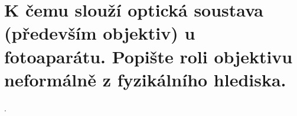 \section{K čemu slouží optická soustava (především objektiv) u fotoaparátu. Popište roli objektivu neformálně z 
fyzikálního hlediska.}.